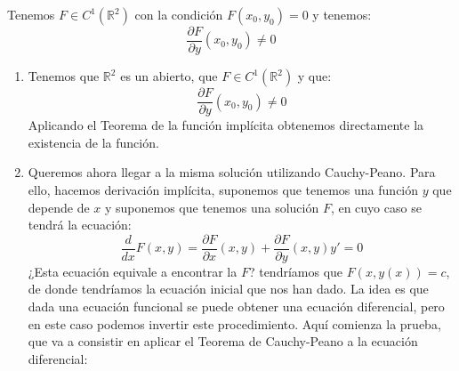\begin{ejercicio}
    Tenemos $F\in C^1(\mathbb{R}^2)$ con la condición $F(x_0,y_0)=0$ y tenemos:
    \begin{equation*}
        \frac{\partial F}{\partial y}(x_0,y_0) \neq 0
    \end{equation*}
    \begin{enumerate}[label=\alph*)]
        \item Tenemos que $\mathbb{R}^2$ es un abierto, que $F\in C^1(\mathbb{R}^2)$ y que:
            \begin{equation*}
                \frac{\partial F}{\partial y}(x_0,y_0) \neq 0
            \end{equation*}
            Aplicando el Teorema de la función implícita obtenemos directamente la existencia de la función.
        \item Queremos ahora llegar a la misma solución utilizando Cauchy-Peano. Para ello, hacemos derivación implícita, suponemos que tenemos una función $y$ que depende de $x$ y suponemos que tenemos una solución $F$, en cuyo caso se tendrá la ecuación:
            \begin{equation*}
                \frac{d}{dx}F(x,y) = \frac{\partial F}{\partial x}(x,y) + \frac{\partial F}{\partial y}(x,y)y' = 0
            \end{equation*}
            ¿Esta ecuación equivale a encontrar la $F$? tendríamos que $F(x,y(x)) = c$, de donde tendríamos la ecuación inicial que nos han dado. La idea es que dada una ecuación funcional se puede obtener una ecuación diferencial, pero en este caso podemos invertir este procedimiento. Aquí comienza la prueba, que va a consistir en aplicar el Teorema de Cauchy-Peano a la ecuación diferencial:


\end{enumerate}
\end{ejercicio}
